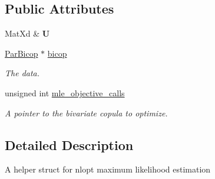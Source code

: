 \subsection*{Public Attributes}
\begin{DoxyCompactItemize}
\item 
\hypertarget{struct_par_bicop_m_l_e_data_af81673f8099b0219544cd2d56a6619db}{Mat\+Xd \& {\bfseries U}}\label{struct_par_bicop_m_l_e_data_af81673f8099b0219544cd2d56a6619db}

\item 
\hypertarget{struct_par_bicop_m_l_e_data_a3dc24c78fe0aaefcda18379eea833d2e}{\hyperlink{class_par_bicop}{Par\+Bicop} $\ast$ \hyperlink{struct_par_bicop_m_l_e_data_a3dc24c78fe0aaefcda18379eea833d2e}{bicop}}\label{struct_par_bicop_m_l_e_data_a3dc24c78fe0aaefcda18379eea833d2e}

\begin{DoxyCompactList}\small\item\em The data. \end{DoxyCompactList}\item 
\hypertarget{struct_par_bicop_m_l_e_data_a7348a3ec361c354bcf676f1f8ec7140a}{unsigned int \hyperlink{struct_par_bicop_m_l_e_data_a7348a3ec361c354bcf676f1f8ec7140a}{mle\+\_\+objective\+\_\+calls}}\label{struct_par_bicop_m_l_e_data_a7348a3ec361c354bcf676f1f8ec7140a}

\begin{DoxyCompactList}\small\item\em A pointer to the bivariate copula to optimize. \end{DoxyCompactList}\end{DoxyCompactItemize}


\subsection{Detailed Description}
A helper struct for nlopt maximum likelihood estimation 